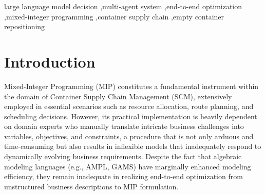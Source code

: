 \documentclass[preprint,12pt]{elsarticle}
\begin{document}
\begin{frontmatter}


\begin{keyword}



large language model decision \sep multi-agent system \sep end-to-end optimization \sep mixed-integer programming \sep container supply chain \sep empty container repositioning
\end{keyword}

\end{frontmatter}

\linenumbers


\section{Introduction}
Mixed-Integer Programming (MIP) constitutes a fundamental instrument within the domain of Container Supply Chain Management (SCM), extensively employed in essential scenarios such as resource allocation, route planning, and scheduling decisions. However, its practical implementation is heavily dependent on domain experts who manually translate intricate business challenges into variables, objectives, and constraints, a procedure that is not only arduous and time-consuming but also results in inflexible models that inadequately respond to dynamically evolving business requirements. Despite the fact that algebraic modeling languages (e.g., AMPL, GAMS) have marginally enhanced modeling efficiency, they remain inadequate in realizing end-to-end optimization from unstructured business descriptions to MIP formulation.
\end{document}
